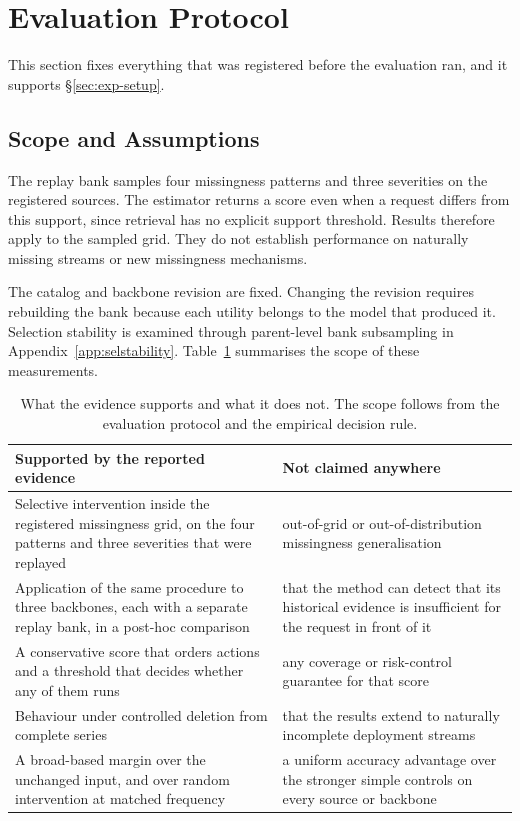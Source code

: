\documentclass{article}
\begin{document}
\section{Evaluation Protocol}
\label{app:protocol}

This section fixes everything that was registered before the evaluation ran, and it
supports \S\ref{sec:exp-setup}.

\subsection{Scope and Assumptions}
\label{app:scope}
The replay bank samples four missingness patterns and three severities on the registered
sources. The estimator returns a score even when a request differs from this support, since
retrieval has no explicit support threshold. Results therefore apply to the sampled grid.
They do not establish performance on naturally missing streams or new missingness mechanisms.

The catalog and backbone revision are fixed. Changing the revision requires rebuilding the
bank because each utility belongs to the model that produced it. Selection stability is
examined through parent-level bank subsampling in Appendix~\ref{app:selstability}.
Table~\ref{tab:app-claims} summarises the scope of these measurements.

\begin{table}[htbp]
  \caption{What the evidence supports and what it does not. The scope follows from the evaluation protocol and the empirical decision rule.}
  \label{tab:app-claims}
  \centering
  \small
  \setlength{\tabcolsep}{4pt}
\begin{tabular}{@{}p{} p{}@{}}
    \toprule
    Supported by the reported evidence & Not claimed anywhere \\
    \midrule
    Selective intervention inside the registered missingness grid, on the four patterns and three severities that were replayed & out-of-grid or out-of-distribution missingness generalisation \\
    Application of the same procedure to three backbones, each with a separate replay bank, in a post-hoc comparison & that the method can detect that its historical evidence is insufficient for the request in front of it \\
    A conservative score that orders actions and a threshold that decides whether any of them runs & any coverage or risk-control guarantee for that score \\
    Behaviour under controlled deletion from complete series & that the results extend to naturally incomplete deployment streams \\
    A broad-based margin over the unchanged input, and over random intervention at matched frequency & a uniform accuracy advantage over the stronger simple controls on every source or backbone \\
    \bottomrule
  \end{tabular}
\end{table}
\end{document}
